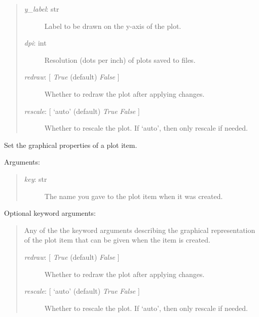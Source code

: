 \documentclass[letterpaper,10pt,english]{sphinxmanual}
\begin{document}
\begin{fulllineitems}
\begin{fulllineitems}
\begin{quote}
\begin{description}
\item[{\emph{y\_label}: str}] \leavevmode
Label to be drawn on the y-axis of the plot.

\item[{\emph{dpi}: int}] \leavevmode
Resolution (dots per inch) of plots saved to files.

\item[{\emph{redraw}: {[} \emph{True}  (default) \textbar{} \emph{False} {]}}] \leavevmode
Whether to redraw the plot after applying changes.

\item[{\emph{rescale}: {[} `auto' (default) \textbar{} \emph{True} \textbar{} \emph{False} {]}}] \leavevmode
Whether to rescale the plot. If `auto', then only rescale if needed.

\end{description}
\end{quote}

\end{fulllineitems}


\begin{fulllineitems}
\label{api:controls.Plot2D.set_properties}
Set the graphical properties of a plot item.

Arguments:
\begin{quote}
\begin{description}
\item[{\emph{key}: str}] \leavevmode
The name you gave to the plot item when it was created.

\end{description}
\end{quote}

Optional keyword arguments:
\begin{quote}

Any of the the keyword arguments describing the graphical representation 
of the plot item that can be given when the item is created.
\begin{description}
\item[{\emph{redraw}: {[} \emph{True}  (default) \textbar{} \emph{False} {]}}] \leavevmode
Whether to redraw the plot after applying changes.

\item[{\emph{rescale}: {[} `auto' (default) \textbar{} \emph{True} \textbar{} \emph{False} {]}}] \leavevmode
Whether to rescale the plot. If `auto', then only rescale if needed.


\end{description}
\end{quote}
\end{fulllineitems}
\end{fulllineitems}
\end{document}
